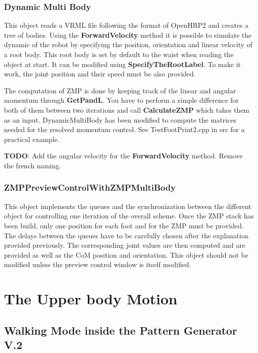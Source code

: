 \subsection{Dynamic Multi Body}
This object reads a VRML file following the format of OpenHRP2 and creates a tree
of bodies. Using the {\bf ForwardVelocity} method it is possible to simulate the
dynamic of the robot by specifying the position, orientation and linear velocity
of a root body. This root body is set by default to the waist when reading the
object at start. It can be modified using {\bf SpecifyTheRootLabel}. 
To make it work, the joint position and their speed must be also provided.
\par
The computation of ZMP is done by keeping track of the linear and angular momentum
through {\bf GetPandL}. You have to perform a simple difference for both of them between two iterations
and call {\bf CalculateZMP} which takes them as an input.
DynamicMultiBody has been modified to compute the matrices needed for the resolved momentum control.
See TestFootPrint2.cpp in src for a practical example.

{\bf TODO}: Add the angular velocity for the {\bf ForwardVelocity} method.
Remove the french naming.

\subsection{ZMPPreviewControlWithZMPMultiBody}

This object implements the queues and the synchronization between the different object
for controlling one iteration of the overall scheme. Once the ZMP stack has been build,
only one position for each foot and for the ZMP must be provided.
The delays between the queues have to be carefully chosen after the explanation provided previously.
The corresponding joint values are then computed and are provided as well as the CoM
position and orientation.
This object should not be modified unless the preview control window is itself modified.

\chapter{The Upper body Motion}

\section{Walking Mode inside the Pattern Generator V.2 }

